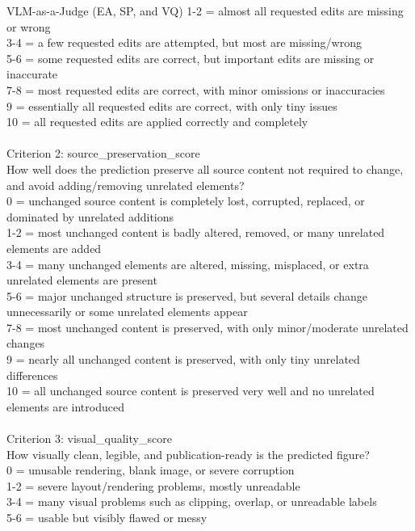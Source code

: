 \begin{PromptBox}{VLM-as-a-Judge (EA, SP, and VQ)}
1-2 = almost all requested edits are missing or wrong \\
3-4 = a few requested edits are attempted, but most are missing/wrong \\
5-6 = some requested edits are correct, but important edits are missing or inaccurate \\
7-8 = most requested edits are correct, with minor omissions or inaccuracies \\
9 = essentially all requested edits are correct, with only tiny issues \\
10 = all requested edits are applied correctly and completely \\\\
Criterion 2: source\_preservation\_score \\
How well does the prediction preserve all source content not required to change, and avoid adding/removing unrelated elements? \\
0 = unchanged source content is completely lost, corrupted, replaced, or dominated by unrelated additions \\
1-2 = most unchanged content is badly altered, removed, or many unrelated elements are added \\
3-4 = many unchanged elements are altered, missing, misplaced, or extra unrelated elements are present \\
5-6 = major unchanged structure is preserved, but several details change unnecessarily or some unrelated elements appear \\
7-8 = most unchanged content is preserved, with only minor/moderate unrelated changes \\
9 = nearly all unchanged content is preserved, with only tiny unrelated differences \\
10 = all unchanged source content is preserved very well and no unrelated elements are introduced \\\\
Criterion 3: visual\_quality\_score \\
How visually clean, legible, and publication-ready is the predicted figure? \\
0 = unusable rendering, blank image, or severe corruption \\
1-2 = severe layout/rendering problems, mostly unreadable \\
3-4 = many visual problems such as clipping, overlap, or unreadable labels \\
5-6 = usable but visibly flawed or messy \\

\end{PromptBox}
